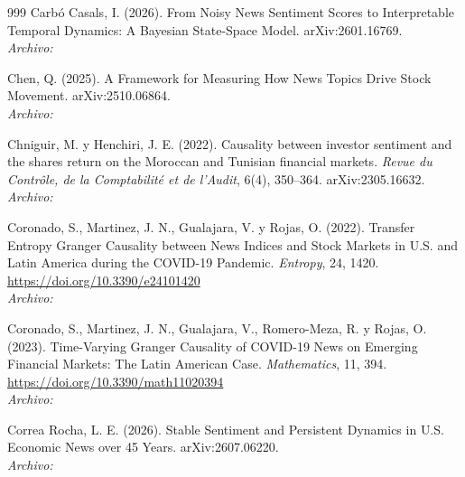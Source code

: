 \begin{thebibliography}{999}
Carb{\'o} Casals, I. (2026). From Noisy News Sentiment Scores to Interpretable Temporal Dynamics: A Bayesian State-Space Model. arXiv:2601.16769.
\\\textit{Archivo:} 

Chen, Q. (2025). A Framework for Measuring How News Topics Drive Stock Movement. arXiv:2510.06864.
\\\textit{Archivo:} 

Chniguir, M. y Henchiri, J. E. (2022). Causality between investor sentiment and the shares return on the Moroccan and Tunisian financial markets. \emph{Revue du Contr{\^o}le, de la Comptabilit{\'e} et de l'Audit}, 6(4), 350--364. arXiv:2305.16632.
\\\textit{Archivo:} 

Coronado, S., Martinez, J. N., Gualajara, V. y Rojas, O. (2022). Transfer Entropy Granger Causality between News Indices and Stock Markets in {U.S.} and {Latin America} during the {COVID-19} Pandemic. \emph{Entropy}, 24, 1420. \url{https://doi.org/10.3390/e24101420}
\\\textit{Archivo:} 

Coronado, S., Martinez, J. N., Gualajara, V., Romero-Meza, R. y Rojas, O. (2023). Time-Varying Granger Causality of {COVID-19} News on Emerging Financial Markets: The {Latin American} Case. \emph{Mathematics}, 11, 394. \url{https://doi.org/10.3390/math11020394}
\\\textit{Archivo:} 

Correa Rocha, L. E. (2026). Stable Sentiment and Persistent Dynamics in {U.S.} Economic News over 45 Years. arXiv:2607.06220.
\\\textit{Archivo:} 


\end{thebibliography}
